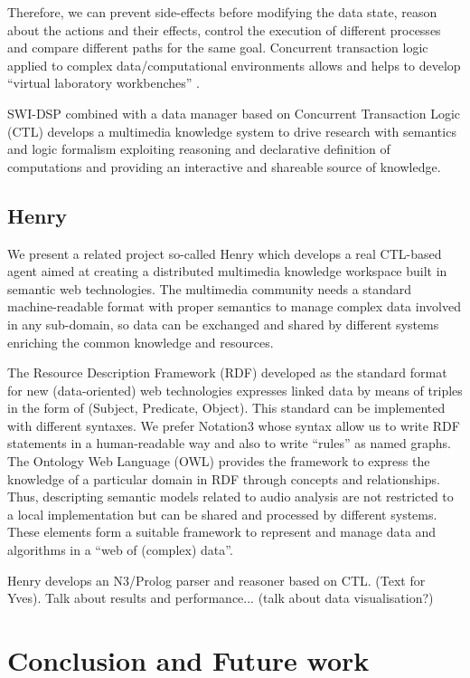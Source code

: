 \documentclass[runningheads]{llncs}
\begin{document}
Therefore, we can prevent side-effects before modifying the data state, reason about the actions and their effects, control the execution of different processes and compare different paths for the same goal. Concurrent transaction logic applied to complex data/computational environments allows and helps to develop ``virtual laboratory workbenches'' \cite{virtual}. 

SWI-DSP combined with a data manager based on Concurrent Transaction Logic (CTL) develops a multimedia knowledge system to drive research with semantics and logic formalism exploiting reasoning and declarative definition of computations and providing an interactive and shareable source of knowledge.

\subsection{Henry}\label{subsec:henry}

We present a related project so-called Henry which develops a real CTL-based agent aimed at creating a distributed multimedia knowledge workspace built in semantic web technologies. The multimedia community needs a standard machine-readable format with proper semantics to manage complex data involved in any sub-domain, so data can be exchanged and shared by different systems enriching the common knowledge and resources.

The Resource Description Framework (RDF) developed as the standard format for new (data-oriented) web technologies expresses linked data by means of triples in the form of (Subject, Predicate, Object). This standard can be implemented with different syntaxes. We prefer Notation3 \cite{n3} whose syntax allow us to write RDF statements in a human-readable way and also to write ``rules'' as named graphs. The Ontology Web Language (OWL) provides the framework to express the knowledge of a particular domain in RDF through concepts and relationships. Thus, descripting semantic models related to audio analysis are not restricted to a local implementation but can be shared and processed by different systems. These elements form a suitable framework to represent and manage data and algorithms in a ``web of (complex) data''.

Henry develops an N3/Prolog parser and reasoner based on CTL. (Text for Yves). Talk about results and performance...
(talk about data visualisation?)

\section{Conclusion and Future work}\label{sec:conclusion}
\end{document}

